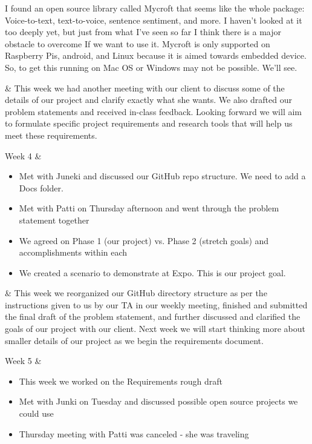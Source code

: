\documentclass[onecolumn, draftclsnofoot,10pt, compsoc]{IEEEtran}
\begin{document}
\begin{center}
\begin{longtabu}
{				I found an open source library called Mycroft that seems like the whole package: Voice-to-text, text-to-voice, sentence sentiment, and more. I haven't looked at it too deeply yet, but just from what I've seen so far I think there is a major obstacle to overcome If we want to use it. Mycroft is only supported on Raspberry Pis, android, and Linux because it is aimed towards embedded device. So, to get this running on Mac OS or Windows may not be possible. We'll see.
			}
			 
 			&
			{
				This week we had another meeting with our client to discuss some of the details of our project and clarify exactly what she wants.
				We also drafted our problem statements and received in-class feedback.
				Looking forward we will aim to formulate specific project requirements and research tools that will help us meet these requirements.	
			}
			\\ \hline
			
			Week 4 
			&
			{
				\begin{itemize}
					\item Met with Juneki and discussed our GitHub repo structure. We need to add a Docs folder.
					\item Met with Patti on Thursday afternoon and went through the problem statement together
					\item We agreed on Phase 1 (our project) vs. Phase 2 (stretch goals) and accomplishments within each
					\item We created a scenario to demonstrate at Expo. This is our project goal.
				\end{itemize}
			}
			 
			&
			{
				This week we reorganized our GitHub directory structure as per the instructions given to us by our TA in our weekly meeting, finished and submitted the final draft of the problem statement, and further discussed and clarified the goals of our project with our client.
				Next week we will start thinking more about smaller details of our project as we begin the requirements document.	
			}
			\\ \hline
			
			Week 5 
			&
			{
				\begin{itemize}
					\item This week we worked on the Requirements rough draft
					\item Met with Junki on Tuesday and discussed possible open source projects we could use
					\item Thursday meeting with Patti was canceled - she was traveling
				\end{itemize}
			}
			 

\end{longtabu}
\end{center}
\end{document}
